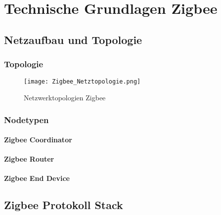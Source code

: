 \clearpage
\section{Technische Grundlagen Zigbee}\label{sec:TechnischeGrundlagenZigbee}

\subsection{Netzaufbau und Topologie}\label{subsec:NetzaufbauundTopologie}


\subsubsection{Topologie}\label{subsubsec:Topologie}


\begin{figure}[h]
	\centering
	\texttt{[image: Zigbee\_Netztopologie.png]}
	\caption{Netzwerktopologien Zigbee \cite{markus_krause_rainer_konrad_drahtlose_2014}}
	\label{fig:NetzwerktopologienZigbee}
\end{figure}

\subsubsection{Nodetypen}\label{subsubsec:Nodetypen}
\paragraph{Zigbee Coordinator}\label{para:ZigbeeCoordinator}

\paragraph{Zigbee Router}\label{para:ZigbeeRouter}

\paragraph{Zigbee End Device}\label{para:ZigbeeEndDevice}





\subsection{Zigbee Protokoll Stack}\label{subsec:ZigbeeProtokollStack}



